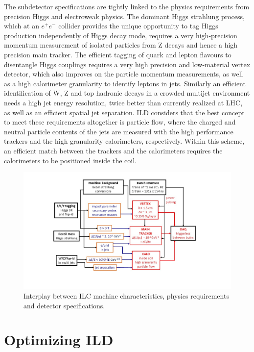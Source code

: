 The subdetector specifications are tightly linked to the physics requirements from precision Higgs and electroweak physics. The dominant Higgs strahlung process, which at an $e^+e^-$ collider provides the unique opportunity to tag Higgs production independently of Higgs decay mode, requires a very high-precision momentum measurement of isolated particles from Z decays and hence a high precision main tracker. The efficient tagging of quark and lepton flavours to disentangle Higgs couplings requires a very high precision and low-material vertex detector, which also improves on the particle momentum measurements, as well as a high calorimeter granularity to identify leptons in jets. Similarly an efficient identification of W, Z and top hadronic decays in a crowded multijet environment needs a high jet energy resolution, twice better than currently realized at LHC, as well as an efficient spatial jet separation. ILD considers that the best concept to meet these requirements altogether is particle flow, where the charged and neutral particle contents of the jets are measured with the high performance trackers and the high granularity calorimeters, respectively. Within this scheme, an efficient match between the trackers and the calorimeters requires the calorimeters to be positioned inside the coil.     

\begin{figure}[t!]
\centering
\includegraphics[width=1.0\hsize]{ILD/fig/ILD_specifications.jpg}
\caption{Interplay between ILC machine characteristics, physics requirements and detector specifications.}
\label{fig:ILD:specifications}
\end{figure}


\section{Optimizing ILD}


